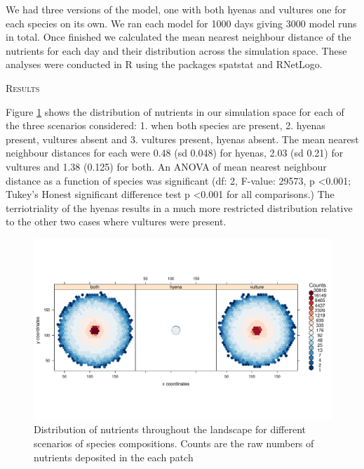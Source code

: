 \documentclass[12pt,letterpaper]{article}
\renewcommand{\section}[1]{%
\bigskip
\begin{center}
\begin{Large}
\normalfont\scshape #1
\medskip
\end{Large}
\end{center}}
\begin{document}
We had three versions of the model, one with both hyenas and vultures one for each species on its own. 
We ran each model for 1000 days giving 3000 model runs in total. 
Once finished we calculated the mean nearest neighbour distance of the nutrients for each day and their distribution across the simulation space. 
These analyses were conducted in R using the packages spatstat and RNetLogo. 

%
%


\section{Results}


Figure \ref{Nutrient Distributions} shows the distribution of nutrients in our simulation space for each of the three scenarios considered: 1. when both species are present, 2. hyenas present, vultures absent and 3. vultures present, hyenas absent. 
The mean nearest neighbour distances for each were 0.48 (sd 0.048) for hyenas, 2.03 (sd 0.21) for vultures and 1.38 (0.125) for both.  
An ANOVA of mean nearest neighbour distance as a function of species was significant (df: 2, F-value: 29573, p \textless 0.001; Tukey's Honest significant difference test p \textless 0.001 for all comparisons.)
The terriotriality of the hyenas results in a much more restricted distribution relative to the other two cases where vultures were present. 

\begin{figure}[H]
\centering
    \includegraphics[keepaspectratio,totalheight=0.5\textheight]{nutrientLandscape.pdf}
\caption{Distribution of nutrients throughout the landscape for different scenarios of species compositions. Counts are the raw numbers of nutrients deposited in the each patch}
\label{Nutrient Distributions}
\end{figure}
\end{document}

